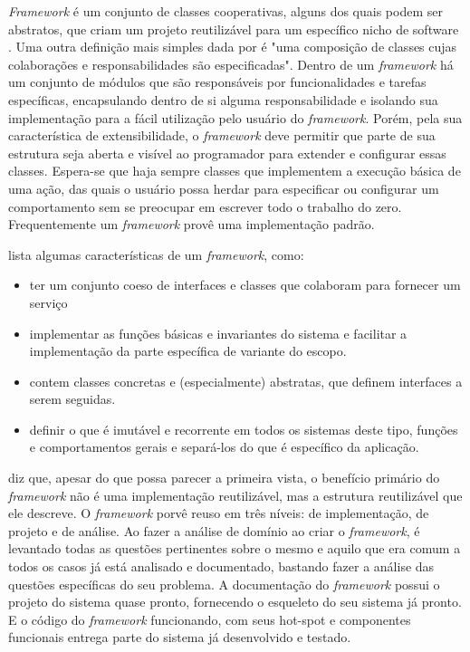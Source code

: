 \textit{Framework} é um conjunto de classes cooperativas, alguns dos quais podem ser abstratos, que criam um projeto reutilizável para um específico nicho de software \cite{Szyperski2002}. Uma outra definição mais simples dada por \cite{Fayad1999} é "uma composição de classes cujas colaborações e responsabilidades são especificadas". Dentro de um \textit{framework} há um conjunto de módulos que são responsáveis por funcionalidades e tarefas específicas, encapsulando dentro de si alguma responsabilidade e isolando sua implementação para a fácil utilização pelo usuário do \textit{framework}. Porém, pela sua característica de extensibilidade, o \textit{framework} deve permitir que parte de sua estrutura seja aberta e visível ao programador para extender e configurar essas classes. Espera-se que haja sempre classes que implementem a execução básica de uma ação, das quais o usuário possa herdar para especificar ou configurar um comportamento sem se preocupar em escrever todo o trabalho do zero. Frequentemente um \textit{framework} provê uma implementação padrão.

\cite{Larman2005} lista algumas características de um \textit{framework}, como:
\begin{itemize}
  \item ter um conjunto coeso de interfaces e classes que colaboram para fornecer um serviço
  \item implementar as funções básicas e invariantes do sistema e facilitar a implementação da parte específica de variante do escopo.
  \item contem classes concretas e (especialmente) abstratas, que definem interfaces a serem seguidas.
  \item definir o que é imutável e recorrente em todos os sistemas deste tipo, funções e comportamentos gerais e separá-los do que é específico da aplicação.  
\end{itemize} 

\cite{Fayad1999} diz que, apesar do que possa parecer a primeira vista, o benefício primário do \textit{framework} não é uma implementação reutilizável, mas a estrutura reutilizável que ele descreve. O \textit{framework} porvê reuso em três níveis: de implementação, de projeto e de análise. Ao fazer a análise de domínio ao criar o \textit{framework}, é levantado todas as questões pertinentes sobre o mesmo e aquilo que era comum a todos os casos já está analisado e documentado, bastando fazer a análise das questões específicas do seu problema. A documentação do \textit{framework} possui o projeto do sistema quase pronto, fornecendo o esqueleto do seu sistema já pronto. E o código do \textit{framework} funcionando, com seus hot-spot e componentes funcionais entrega parte do sistema já desenvolvido e testado.

